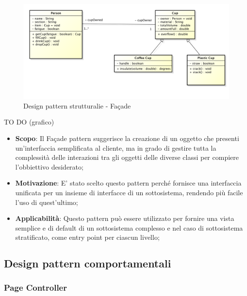 		
		\begin{figure}[htbp]
			\centering
			\centerline{\includegraphics[scale=0.3]{./images/example_graph.png}}
			\caption{Design pattern strutturalie - Fa\c{c}ade}
		\end{figure}
		TO DO (grafico)
		
		
		\begin{itemize}
			\item \textbf{Scopo}: Il Fa\c{c}ade pattern suggerisce la creazione di un oggetto che presenti un'interfaccia semplificata al cliente, ma in grado di gestire tutta la complessità delle interazioni tra gli oggetti delle diverse classi per compiere l'obbiettivo desiderato;
			
			\item \textbf{Motivazione}: E' stato scelto questo pattern perché fornisce una interfaccia unificata per un insieme di interfacce di un sottosistema, rendendo più facile l'uso di quest'ultimo;
			
			\item \textbf{Applicabilità}: Questo pattern può essere utilizzato per fornire una vista semplice e di default di un sottosistema complesso e nel caso di sottosistema stratificato, come entry point per ciascun livello;
			
		\end{itemize}




	\clearpage 
	\newpage
	\subsection{Design pattern comportamentali} %
		\subsubsection{Page Controller} %
		
